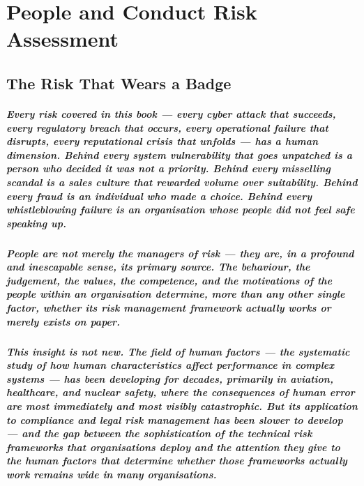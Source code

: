 \chapter{People and Conduct Risk Assessment}
\label{chap:People and Conduct Risk Assessment}

\section{The Risk That Wears a Badge}
\paragraph{Every risk covered in this book — every cyber attack that succeeds, every regulatory breach that occurs, every operational failure that disrupts, every reputational crisis that unfolds — has a human dimension. Behind every system vulnerability that goes unpatched is a person who decided it was not a priority. Behind every misselling scandal is a sales culture that rewarded volume over suitability. Behind every fraud is an individual who made a choice. Behind every whistleblowing failure is an organisation whose people did not feel safe speaking up.}
\paragraph{People are not merely the managers of risk — they are, in a profound and inescapable sense, its primary source. The behaviour, the judgement, the values, the competence, and the motivations of the people within an organisation determine, more than any other single factor, whether its risk management framework actually works or merely exists on paper.}
\paragraph{This insight is not new. The field of human factors — the systematic study of how human characteristics affect performance in complex systems — has been developing for decades, primarily in aviation, healthcare, and nuclear safety, where the consequences of human error are most immediately and most visibly catastrophic. But its application to compliance and legal risk management has been slower to develop — and the gap between the sophistication of the technical risk frameworks that organisations deploy and the attention they give to the human factors that determine whether those frameworks actually work remains wide in many organisations.}
